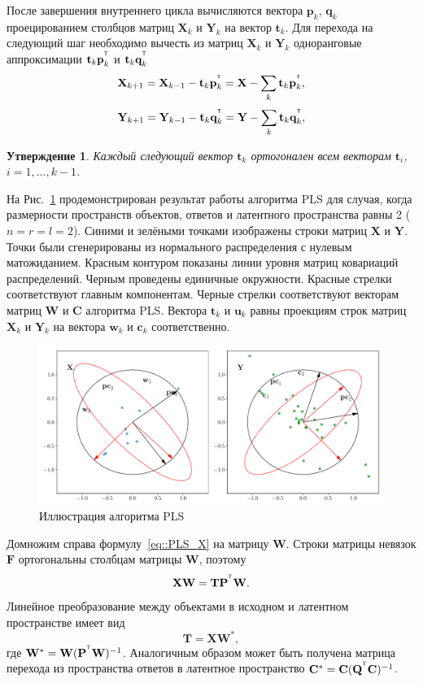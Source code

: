 \documentclass[12pt,twoside]{article}
\newtheorem{statement}{Утверждение}
\newcommand{\bw}{\mathbf{w}}
\newcommand{\bY}{\mathbf{Y}}
\newcommand{\bX}{\mathbf{X}}
\newcommand{\bu}{\mathbf{u}}
\newcommand{\bt}{\mathbf{t}}
\newcommand{\bp}{\mathbf{p}}
\newcommand{\bq}{\mathbf{q}}
\newcommand{\bc}{\mathbf{c}}
\newcommand{\bP}{\mathbf{P}}
\newcommand{\bT}{\mathbf{T}}
\newcommand{\bQ}{\mathbf{Q}}
\newcommand{\bC}{\mathbf{C}}
\newcommand{\bF}{\mathbf{F}}
\newcommand{\bW}{\mathbf{W}}
\begin{document}
После завершения внутреннего цикла вычисляются вектора $\bp_k$, $\bq_k$ проецированием столбцов матриц $\bX_k$ и $\bY_k$ на вектор $\bt_k$. Для перехода на следующий шаг необходимо вычесть из матриц $\bX_k$ и $\bY_k$ одноранговые аппроксимации $\bt_k \bp_k^{\T}$ и $\bt_k \bq_k^{\T}$
\begin{equation*}
    \bX_{k + 1} = \bX_{k-1} - \bt_k \bp_k^{\T} = \bX - \sum_k \bt_k \bp_k^{\T},
\end{equation*}
\begin{equation*}
    \bY_{k + 1} = \bY_{k-1} - \bt_k \bq_k^{\T} = \bY - \sum_k \bt_k \bq_k^{\T},
\end{equation*}
\begin{statement}
Каждый следующий вектор $\bt_k$ ортогонален всем векторам $\bt_i$, $i=1, \dots, k - 1$.
\end{statement}

На Рис.~\ref{fig::PLSFigure} продемонстрирован результат работы алгоритма PLS для случая, когда размерности пространств объектов, ответов и латентного пространства равны 2 ($n = r = l = 2$).
Синими и зелёными точками изображены строки матриц $\bX$ и $\bY$. 
Точки были сгенерированы из нормального распределения с нулевым матожиданием. 
Красным контуром показаны линии уровня матриц ковариаций распределений. 
Черным проведены единичные окружности. 
Красные стрелки соответствуют главным компонентам. 
Черные стрелки соответствуют векторам матриц $\bW$ и $\bC$ алгоритма PLS. 
Вектора $\bt_k$ и $\bu_k$ равны проекциям строк матриц $\bX_k$ и $\bY_k$ на вектора $\bw_k$ и $\bc_k$ соответственно. 
\begin{figure}[h]
	\centering
	\includegraphics[width=\linewidth]{figs/PLSFigure.pdf}
	\caption{Иллюстрация алгоритма PLS}
	\label{fig::PLSFigure}
\end{figure}

Домножим справа формулу~\eqref{eq::PLS_X} на матрицу $\bW$. Строки матрицы невязок $\bF$ ортогональны столбцам матрицы $\bW$, поэтому 
\[
	\bX \bW = \bT \bP^{\T} \bW.
\] 
Линейное преобразование между объектами в исходном и латентном пространстве имеет вид
\begin{equation}
	\bT = \bX \bW^*,
	\label{eq::W*}
\end{equation}
где $\bW^* = \bW (\bP^{\T} \bW)^{-1}$. Аналогичным образом может быть получена матрица перехода из пространства ответов в латентное пространство $\bC^* = \bC (\bQ^{\T} \bC)^{-1}$.
\end{document}
